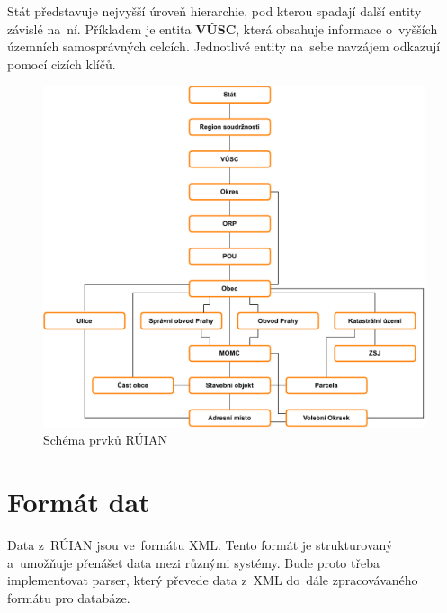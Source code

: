 Stát představuje nejvyšší úroveň hierarchie, pod kterou spadají další entity závislé na~ní. 
Příkladem je entita \textbf{VÚSC}, která obsahuje informace o~vyšších územních samosprávných celcích. 
Jednotlivé entity na~sebe navzájem odkazují pomocí cizích klíčů.

\begin{figure}[!h]
    \centering
    \includegraphics[width=\textwidth]{figures/ruian_diagram.pdf}
    \caption{Schéma prvků RÚIAN}
    \label{fig:ruian_tables}
\end{figure}

\newpage

\section{Formát dat}
Data z~RÚIAN jsou ve~formátu XML. Tento formát je strukturovaný a~umožňuje přenášet data mezi různými systémy. 
Bude proto třeba implementovat parser, který převede data z~XML do~dále zpracovávaného formátu pro databáze.
